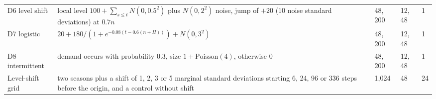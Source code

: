\begin{table}[!htbp]
\begin{tabular}{>{\raggedright\arraybackslash}p{2.8cm}>{\raggedright\arraybackslash}p{7.7cm}lll}
D6 level shift & local level $100 + \sum_{s \le t} N(0, 0.5^2)$ plus $N(0, 2^2)$ noise, jump of $+20$ (10 noise standard deviations)
at $0.7n$ & 48, 200 & 12, 48 & 1 \\
D7 logistic & $20 + 180 / (1 + e^{-0.08 (t - 0.6 (n + H))}) + N(0, 3^2)$ & 48, 200 & 12, 48 & 1 \\
D8 intermittent & demand occurs with probability 0.3, size $1 + \mathrm{Poisson}(4)$, otherwise 0 & 48, 200 & 12, 48 & 1 \\
Level-shift grid & two seasons plus a shift of 1, 2, 3 or 5 marginal standard deviations starting 6, 24, 96 or 336 steps
before the origin, and a control without shift & 1{,}024 & 48 & 24 \\
\bottomrule
\end{tabular}
\end{table}
